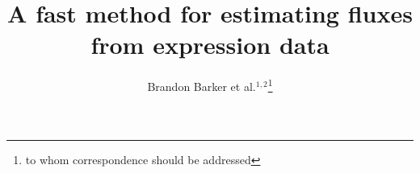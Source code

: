 \documentclass{bioinfo}
\begin{document}








\title[FALCON]{A fast method for estimating fluxes
  from expression data}
    \author[Barker \textit{et~al.}]{Brandon Barker et al.$^{1,2}$\footnote{to whom correspondence should be addressed}}

\address{$^{1}$Tri-Institutional Training Program in Computational
  Biology and Medicine, 1300 York Avenue, Box 194, New York, NY 10065\\
  $^{2}$Department of Biological Statistics and Computational Biology, 
    Cornell University, 1198 Comstock Hall, Ithaca, NY 14853-2601\\
  }
\end{document}
